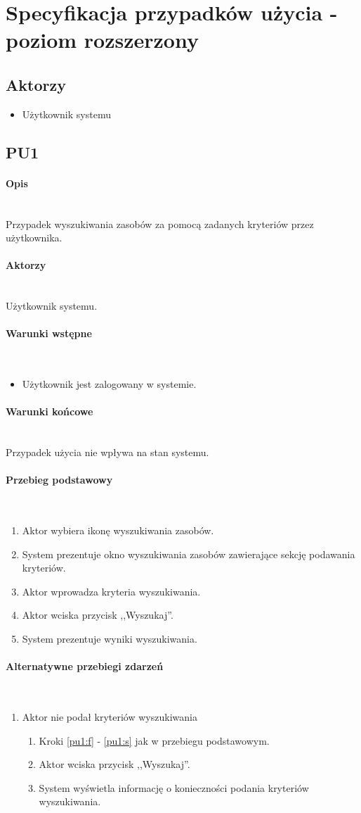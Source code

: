 \section{Specyfikacja przypadków użycia - poziom rozszerzony}
\newcommand{\myparagraph}[1]{\paragraph{#1}\mbox{}\\}

\subsection{Aktorzy}
\begin{itemize}
\item Użytkownik systemu
\end{itemize}


\subsection{PU1} \label{pu1}
\myparagraph{Opis}
Przypadek wyszukiwania zasobów za pomocą zadanych kryteriów przez użytkownika.

\myparagraph{Aktorzy}
Użytkownik systemu.

\myparagraph{Warunki wstępne}
\begin{itemize}
\item Użytkownik jest zalogowany w systemie.
\end{itemize}

\myparagraph{Warunki końcowe}
Przypadek użycia nie wpływa na stan systemu.

\myparagraph{Przebieg podstawowy}
\begin{enumerate}
\item \label{pu1:f} Aktor wybiera ikonę wyszukiwania zasobów.
\item \label{pu1:s}System prezentuje okno wyszukiwania zasobów zawierające sekcję podawania kryteriów.
\item Aktor wprowadza kryteria wyszukiwania.
\item Aktor wciska przycisk ,,Wyszukaj''.
\item System prezentuje wyniki wyszukiwania.
\end{enumerate}

\myparagraph{Alternatywne przebiegi zdarzeń}
\begin{enumerate}
\item Aktor nie podał kryteriów wyszukiwania
	\begin{enumerate}[label*=\arabic*.]
	\item Kroki \ref{pu1:f} - \ref{pu1:s} jak w przebiegu podstawowym.
	\item Aktor wciska przycisk ,,Wyszukaj''.
	\item System wyświetla informację o konieczności podania kryteriów wyszukiwania.
	\end{enumerate}
\end{enumerate}


